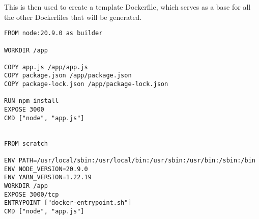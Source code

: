 This is then used to create a template Dockerfile, which serves as a base for all the other Dockerfiles that will be generated.

\lstset{language=Dockerfile,caption=Dockerfile.minimal.template,label=lst:template-minimal-dockerfile}
\begin{lstlisting}
FROM node:20.9.0 as builder

WORKDIR /app

COPY app.js /app/app.js
COPY package.json /app/package.json
COPY package-lock.json /app/package-lock.json

RUN npm install
EXPOSE 3000
CMD ["node", "app.js"]


FROM scratch

ENV PATH=/usr/local/sbin:/usr/local/bin:/usr/sbin:/usr/bin:/sbin:/bin
ENV NODE_VERSION=20.9.0
ENV YARN_VERSION=1.22.19
WORKDIR /app
EXPOSE 3000/tcp
ENTRYPOINT ["docker-entrypoint.sh"]
CMD ["node", "app.js"]
\end{lstlisting}
